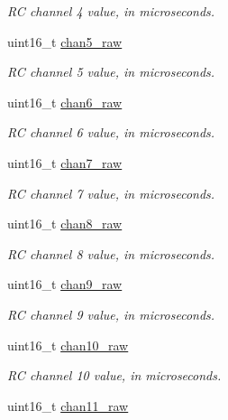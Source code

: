 \begin{DoxyCompactItemize}
\begin{DoxyCompactList}\small\item\em R\+C channel 4 value, in microseconds. \end{DoxyCompactList}\item 
uint16\+\_\+t \hyperlink{struct____mavlink__hil__rc__inputs__raw__t_aa351a492148d22983343be216e10e945}{chan5\+\_\+raw}
\begin{DoxyCompactList}\small\item\em R\+C channel 5 value, in microseconds. \end{DoxyCompactList}\item 
uint16\+\_\+t \hyperlink{struct____mavlink__hil__rc__inputs__raw__t_a861d32c4cee885839426c6c27e9985f7}{chan6\+\_\+raw}
\begin{DoxyCompactList}\small\item\em R\+C channel 6 value, in microseconds. \end{DoxyCompactList}\item 
uint16\+\_\+t \hyperlink{struct____mavlink__hil__rc__inputs__raw__t_a58471d376608366dc4e762c1cc07f0da}{chan7\+\_\+raw}
\begin{DoxyCompactList}\small\item\em R\+C channel 7 value, in microseconds. \end{DoxyCompactList}\item 
uint16\+\_\+t \hyperlink{struct____mavlink__hil__rc__inputs__raw__t_a5e2a946b0960b971317637874d4f2678}{chan8\+\_\+raw}
\begin{DoxyCompactList}\small\item\em R\+C channel 8 value, in microseconds. \end{DoxyCompactList}\item 
uint16\+\_\+t \hyperlink{struct____mavlink__hil__rc__inputs__raw__t_aebe7c293f27d5b25c78caa8f762c57e2}{chan9\+\_\+raw}
\begin{DoxyCompactList}\small\item\em R\+C channel 9 value, in microseconds. \end{DoxyCompactList}\item 
uint16\+\_\+t \hyperlink{struct____mavlink__hil__rc__inputs__raw__t_ac49fe649301c639a71ae5a5778934a3c}{chan10\+\_\+raw}
\begin{DoxyCompactList}\small\item\em R\+C channel 10 value, in microseconds. \end{DoxyCompactList}\item 
uint16\+\_\+t \hyperlink{struct____mavlink__hil__rc__inputs__raw__t_a09b92c1ec569948809c152e74bd61655}{chan11\+\_\+raw}

\end{DoxyCompactItemize}

